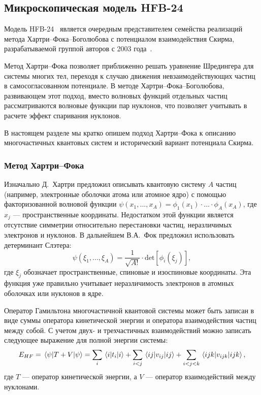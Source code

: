 \subsection{Микроскопическая модель HFB-24}
Модель HFB-24~\cite{goriely2013} является очередным представителем семейства реализаций метода Хартри--Фока--Боголюбова с потенциалом взаимодействия Скирма, разрабатываемой группой авторов с 2003 года~\cite{samyn2003}. 

Метод Хартри--Фока позволяет приближенно решать уравнение Шредингера для системы многих тел, переходя к случаю движения невзаимодействующих частиц в самосогласованном потенциале. В методе Хартри--Фока--Боголюбова, развивающем этот подход, вместо волновых функций отдельных частиц рассматриваются волновые функции пар нуклонов, что позволяет учитывать в расчете эффект спаривания нуклонов. 

В настоящем разделе мы кратко опишем подход Хартри--Фока к описанию многочастичных квантовых систем и исторический вариант потенциала Скирма.

\subsubsection{Метод Хартри--Фока}
Изначально Д.~Хартри предложил описывать квантовую систему $A$ частиц (например, электронные оболочки атома или атомное ядро) с помощью факторизованной волновой функции $\psi(x_1, ..., x_A) = \phi_1(x_1) \cdot ... \cdot \phi_A(x_A)$, где $x_j$ --- пространственные координаты. Недостатком этой функции является отсутствие симметрии относительно перестановки частиц, неразличимых электронов и нуклонов. В дальнейшем В.А.~Фок предложил использовать детерминант Слэтера:
\begin{equation}
\displaystyle
\psi(\xi_1, ..., \xi_A) = \frac{1}{\sqrt{A!}} \cdot \text{det} 
\left[ \phi_i (\xi_j) \right],
\end{equation}
где $\xi_j$ обозначает пространственные, спиновые и изоспиновые координаты. Эта функция уже правильно учитывает неразличимость электронов в атомных оболочках или нуклонов в ядре.

Оператор Гамильтона многочастичной квантовой системы может быть записан в виде суммы оператора кинетической энергии и оператора взаимодействия частиц между собой. С учетом двух- и трехчастичных взаимодействий можно записать следующее выражение для полной энергии системы:
\begin{equation}
E_{HF} = \expval{T + V}{\psi} = \sum_i \expval{t_i}{i} 
  + \sum_{i < j} \expval{v_{ij}}{ij}
  + \sum_{i < j < k} \expval{v_{ijk}}{ijk}, 
\label{eq:hs-energy}
\end{equation}
где $T$ --- оператор кинетической энергии, а $V$ --- оператор взаимодействий между нуклонами.

